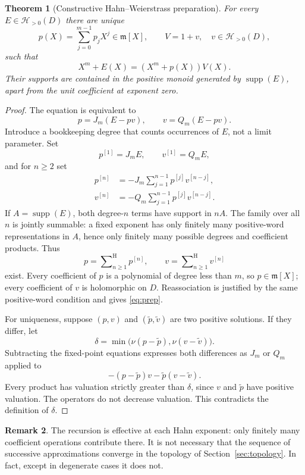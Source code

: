 \documentclass[11pt,oneside]{article}
\newtheorem{theorem}{Theorem}[section]
\theoremstyle{definition}\newtheorem{definition}[theorem]{Definition}
\newtheorem{remark}[theorem]{Remark}
\newcommand{\HH}{\mathcal H}
\newcommand{\mm}{\mathfrak m}
\newcommand{\supp}{\operatorname{supp}}
\newcommand{\Hsum}{\mathop{\sum}\nolimits^{\mathrm H}}
\newcommand{\val}{\nu}
\begin{document}
\begin{theorem}[Constructive Hahn--Weierstrass preparation]\label{thm:preparation}
For every $E\in\HH_{>0}(D)$ there are unique
\[
 p(X)=\sum_{j=0}^{m-1}p_jX^j\in\mm[X],
 \qquad V=1+v,\quad v\in\HH_{>0}(D),
\]
such that
\begin{equation}\label{eq:prep}
 X^m+E(X)=(X^m+p(X))V(X).
\end{equation}
Their supports are contained in the positive monoid generated by $\supp(E)$, apart from the unit coefficient at exponent zero.
\end{theorem}
\begin{proof}
The equation is equivalent to
\[
 p=J_m(E-pv),\qquad v=Q_m(E-pv).
\]
Introduce a bookkeeping degree that counts occurrences of $E$, not a limit parameter. Set
\[
 p^{[1]}=J_mE,\qquad v^{[1]}=Q_mE,
\]
and for $n\geq2$ set
\begin{align*}
 p^{[n]}&=-J_m\sum_{j=1}^{n-1}p^{[j]}v^{[n-j]},\\
 v^{[n]}&=-Q_m\sum_{j=1}^{n-1}p^{[j]}v^{[n-j]}.
\end{align*}
If $A=\supp(E)$, both degree-$n$ terms have support in $nA$. The family over all $n$ is jointly summable: a fixed exponent has only finitely many positive-word representations in $A$, hence only finitely many possible degrees and coefficient products. Thus
\[
 p=\Hsum_{n\geq1}p^{[n]},\qquad v=\Hsum_{n\geq1}v^{[n]}
\]
exist. Every coefficient of $p$ is a polynomial of degree less than $m$, so $p\in\mm[X]$; every coefficient of $v$ is holomorphic on $D$. Reassociation is justified by the same positive-word condition and gives \eqref{eq:prep}.

For uniqueness, suppose $(p,v)$ and $(\widetilde p,\widetilde v)$ are two positive solutions. If they differ, let
\[
 \delta=\min\bigl(\val(p-\widetilde p),\val(v-\widetilde v)\bigr).
\]
Subtracting the fixed-point equations expresses both differences as $J_m$ or $Q_m$ applied to
\[
 -(p-\widetilde p)v-\widetilde p(v-\widetilde v).
\]
Every product has valuation strictly greater than $\delta$, since $v$ and $\widetilde p$ have positive valuation. The operators do not decrease valuation. This contradicts the definition of $\delta$.
\end{proof}

\begin{remark}
The recursion is effective at each Hahn exponent: only finitely many coefficient operations contribute there. It is not necessary that the sequence of successive approximations converge in the topology of Section~\ref{sec:topology}. In fact, except in degenerate cases it does not.
\end{remark}
\end{document}
